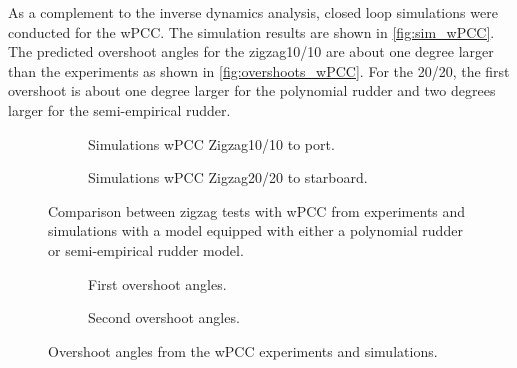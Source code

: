 As a complement to the inverse dynamics analysis, closed loop simulations were conducted for the wPCC. The simulation results are shown in \autoref{fig:sim_wPCC}. The predicted overshoot angles for the zigzag10/10 are about one degree larger than the experiments as shown in \autoref{fig:overshoots_wPCC}. For the 20/20, the first overshoot is about one degree larger for the polynomial rudder and two degrees larger for the semi-empirical rudder.       

\begin{figure}[h]
     \centering
     \begin{subfigure}[b]{\textwidth}
         \centering
         
        \caption{Simulations wPCC Zigzag10/10 to port.}
        \label{fig:sim_wPCC_10}
     \end{subfigure}
     \vfill
     \begin{subfigure}[b]{\textwidth}
        \centering
        
        \caption{Simulations wPCC Zigzag20/20 to starboard.}
        \label{fig:sim_wPCC_20}
     \end{subfigure}
        \caption{Comparison between zigzag tests with wPCC from experiments and simulations with a model equipped with either a polynomial rudder or semi-empirical rudder model.}
        \label{fig:sim_wPCC}
\end{figure}

\begin{figure}[h]
     \centering
     \begin{subfigure}[b]{\textwidth}
         \centering
         
        \caption{First overshoot angles.}
        \label{fig:overhoots1_wPCC}
     \end{subfigure}
     \vfill
     \begin{subfigure}[b]{\textwidth}
         \centering
         
        \caption{Second overshoot angles.}
        \label{fig:overhoots2_wPCC}
     \end{subfigure}
     
        \caption{Overshoot angles from the wPCC experiments and simulations.}
        \label{fig:overshoots_wPCC}
\end{figure}
